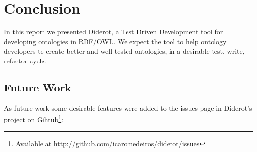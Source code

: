 \documentclass{report}
\begin{document}
\chapter{Conclusion}
\label{conclusion}

In this report we presented Diderot, a Test Driven Development tool for developing ontologies in RDF/OWL.
We expect the tool to help ontology developers to create better and well tested ontologies, in a desirable test, write, refactor cycle.

\section{Future Work}

As future work some desirable features were added to the issues page in Diderot's project on Gihtub\footnote{Available at \url{http://github.com/icaromedeiros/diderot/issues}}:
\end{document}
